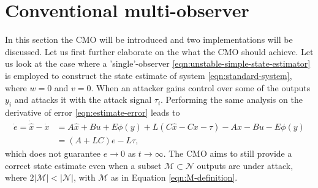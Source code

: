 \section{Conventional multi-observer}\label{ch:cmo}
In this section the CMO will be introduced and two implementations will be discussed. Let us first further elaborate on the what the CMO should achieve. Let us look at the case where a 'single'-observer \eqref{eqn:unstable-simple-state-estimator} is employed to construct the state estimate of system \eqref{eqn:standard-system}, where $w=0$ and $v=0$. When an attacker gains control over some of the outputs $y_i$ and attacks it with the attack signal $\tau_i$. Performing the same analysis on the derivative of error \eqref{eqn:estimate-error} leads to
\begin{equation*}
    \begin{split}
        \dot{e} = \dot{\hat{x}} - \dot{x} &= A\hat{x} + Bu + E\phi(y) + L(C\hat{x} - Cx - \tau) - Ax - Bu - E\phi(y) \\
        &= (A+LC)e - L\tau,
    \end{split}
\end{equation*}
which does not guarantee $e \rightarrow 0$ as $t \rightarrow \infty$. The CMO aims to still provide a correct state estimate even when a subset $\mathcal{M} \subset \mathcal{N}$ outputs are under attack, where $2|\mathcal{M}| < |\mathcal{N}|$, with $\mathcal{M}$ as in Equation \ref{eqn:M-definition}. 

